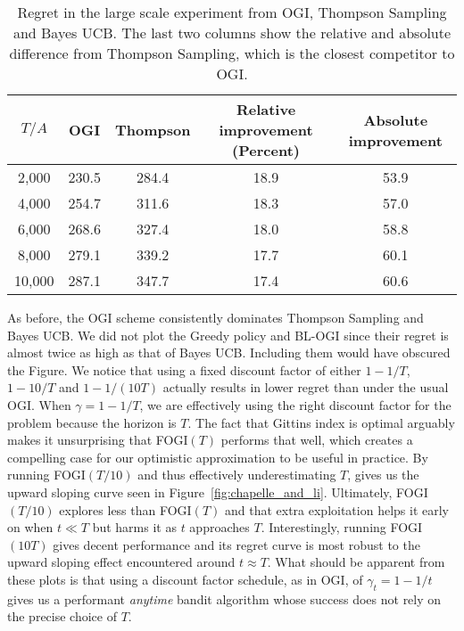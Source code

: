 \begin{table}[h!]
	\centering
	{\color{blue}
	\begin{tabular}{c|cccc}
		\toprule
		$T/A$ &   OGI &  Thompson &  Relative improvement (Percent) &  Absolute improvement \\
		\midrule
		2,000 & 230.5 &     284.4 &                            18.9 &                  53.9 \\
		4,000 & 254.7 &     311.6 &                            18.3 &                  57.0 \\
		6,000 & 268.6 &     327.4 &                            18.0 &                  58.8 \\
		8,000 & 279.1 &     339.2 &                            17.7 &                  60.1 \\
		10,000 & 287.1 &     347.7 &                            17.4 &                  60.6 \\
		\bottomrule
	\end{tabular}
	}
	\caption{Regret in the large scale experiment from OGI, Thompson Sampling and Bayes UCB. The last two columns show the relative and absolute difference from Thompson Sampling, which is the closest competitor to OGI.}
	\label{table:additional_cli_table}
\end{table}

As before, the OGI scheme consistently dominates {\color{blue}Thompson Sampling and Bayes UCB. We did not plot the Greedy policy and BL-OGI since their regret is almost twice as high as that of Bayes UCB. Including them would have obscured the Figure. We notice that using a fixed discount factor of either $1-1/T$,  $1-10/T$ and  $1-1/(10T)$ actually results in lower regret than under the usual OGI. When $\gamma = 1 - 1/T$, we are effectively using the right discount factor for the problem because the horizon is $T$. The fact that Gittins index is optimal arguably makes it unsurprising that FOGI$(T)$ performs that well, which creates a compelling case for our optimistic approximation to be useful in practice.  By running FOGI$(T/10)$ and thus effectively underestimating $T$, gives us the upward sloping curve seen in Figure~\ref{fig:chapelle_and_li}. Ultimately, FOGI$(T/10)$ explores less than FOGI$(T)$ and that extra exploitation helps it early on when $t \ll T$ but harms it as $t$ approaches $T$. Interestingly, running FOGI$(10T)$ gives decent performance and its regret curve is most robust to the upward sloping effect encountered around $t \approx T$. What should be apparent from these plots is that using a discount factor schedule, as in OGI, of $\gamma_t = 1-1/t$ gives us a performant \emph{anytime} bandit algorithm whose success does not rely on the precise choice of $T$.}


